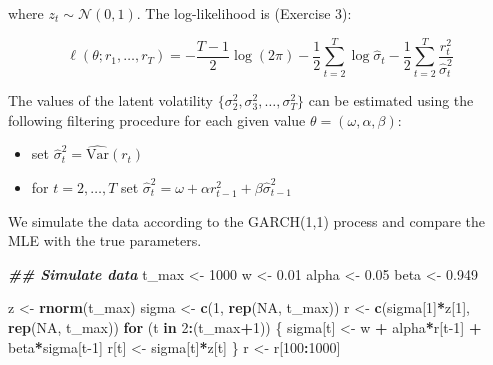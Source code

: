 \documentclass[
]{book}
\newenvironment{Shaded}{\begin{snugshade}}{\end{snugshade}}
\newcommand{\ConstantTok}[1]{\textcolor[rgb]{0.56,0.35,0.01}{#1}}
\newcommand{\ControlFlowTok}[1]{\textcolor[rgb]{0.13,0.29,0.53}{\textbf{#1}}}
\newcommand{\DecValTok}[1]{\textcolor[rgb]{0.00,0.00,0.81}{#1}}
\newcommand{\DocumentationTok}[1]{\textcolor[rgb]{0.56,0.35,0.01}{\textbf{\textit{#1}}}}
\newcommand{\FloatTok}[1]{\textcolor[rgb]{0.00,0.00,0.81}{#1}}
\newcommand{\FunctionTok}[1]{\textcolor[rgb]{0.13,0.29,0.53}{\textbf{#1}}}
\newcommand{\NormalTok}[1]{#1}
\newcommand{\OtherTok}[1]{\textcolor[rgb]{0.56,0.35,0.01}{#1}}
\newcommand{\SpecialCharTok}[1]{\textcolor[rgb]{0.81,0.36,0.00}{\textbf{#1}}}
\providecommand{\tightlist}{%
  \setlength{\itemsep}{0pt}\setlength{\parskip}{0pt}}
\begin{document}
where \(z_t \sim \mathcal{N}(0, 1)\). The log-likelihood is (Exercise 3):

\[
\ell(\theta; r_1, \dots, r_T) = -\frac{T-1}{2}\log(2\pi) - \frac{1}{2}\sum_{t=2}^T\log\hat\sigma_t -\frac{1}{2} \sum_{t=2}^T \frac{r_t^2}{\hat\sigma^2_t}
\]

The values of the latent volatility \(\{\sigma_2^2, \sigma_3^2, \dots, \sigma_T^2\}\) can be estimated using the following filtering procedure for each given value \(\theta = (\omega, \alpha, \beta)\):

\begin{itemize}
\tightlist
\item
  set \(\hat\sigma^2_t = \hat{\text{Var}}(r_t)\)
\item
  for \(t = 2, \dots, T\) set \(\hat\sigma^2_t = \omega + \alpha r_{t-1}^2 + \beta \hat\sigma^2_{t-1}\)
\end{itemize}

We simulate the data according to the GARCH(1,1) process and compare the MLE with the true parameters.

\begin{Shaded}
\begin{Highlighting}[]
\DocumentationTok{\#\# Simulate data}
\NormalTok{t\_max }\OtherTok{\textless{}{-}} \DecValTok{1000}
\NormalTok{w }\OtherTok{\textless{}{-}} \FloatTok{0.01}
\NormalTok{alpha }\OtherTok{\textless{}{-}} \FloatTok{0.05}
\NormalTok{beta }\OtherTok{\textless{}{-}} \FloatTok{0.949}

\NormalTok{z }\OtherTok{\textless{}{-}} \FunctionTok{rnorm}\NormalTok{(t\_max)}
\NormalTok{sigma }\OtherTok{\textless{}{-}} \FunctionTok{c}\NormalTok{(}\DecValTok{1}\NormalTok{, }\FunctionTok{rep}\NormalTok{(}\ConstantTok{NA}\NormalTok{, t\_max))}
\NormalTok{r     }\OtherTok{\textless{}{-}} \FunctionTok{c}\NormalTok{(sigma[}\DecValTok{1}\NormalTok{]}\SpecialCharTok{*}\NormalTok{z[}\DecValTok{1}\NormalTok{], }\FunctionTok{rep}\NormalTok{(}\ConstantTok{NA}\NormalTok{, t\_max))}
\ControlFlowTok{for}\NormalTok{ (t }\ControlFlowTok{in} \DecValTok{2}\SpecialCharTok{:}\NormalTok{(t\_max}\SpecialCharTok{+}\DecValTok{1}\NormalTok{)) \{}
\NormalTok{  sigma[t] }\OtherTok{\textless{}{-}}\NormalTok{ w }\SpecialCharTok{+}\NormalTok{ alpha}\SpecialCharTok{*}\NormalTok{r[t}\DecValTok{{-}1}\NormalTok{] }\SpecialCharTok{+}\NormalTok{ beta}\SpecialCharTok{*}\NormalTok{sigma[t}\DecValTok{{-}1}\NormalTok{]}
\NormalTok{  r[t]     }\OtherTok{\textless{}{-}}\NormalTok{ sigma[t]}\SpecialCharTok{*}\NormalTok{z[t]}
\NormalTok{\}}
\NormalTok{r }\OtherTok{\textless{}{-}}\NormalTok{ r[}\DecValTok{100}\SpecialCharTok{:}\DecValTok{1000}\NormalTok{]}
\end{Highlighting}
\end{Shaded}
\end{document}
